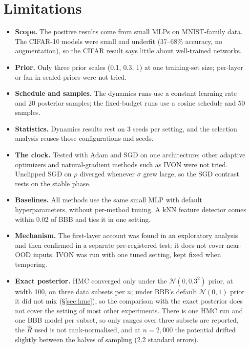 \documentclass[11pt]{article}
\begin{document}
\section{Limitations}
\begin{itemize}
\item \textbf{Scope.} The positive results come from small MLPs on
MNIST-family data. The CIFAR-10 models were small and underfit (37--68\%
accuracy, no augmentation), so the CIFAR result says little about well-trained
networks.
\item \textbf{Prior.} Only three prior scales (0.1, 0.3, 1) at one
training-set size; per-layer or fan-in-scaled priors were not tried.
\item \textbf{Schedule and samples.} The dynamics runs use a constant learning
rate and 20 posterior samples; the fixed-budget runs use a cosine schedule and
50 samples.
\item \textbf{Statistics.} Dynamics results rest on 3 seeds per setting, and the
selection analysis reuses those configurations and seeds.
\item \textbf{The clock.} Tested with Adam and SGD on one architecture; other
adaptive optimizers and natural-gradient methods such as IVON
\citep{shen2024variational} were not tried. Unclipped SGD on $\rho$ diverged
whenever $\sigma$ grew large, so the SGD contrast rests on the stable phase.
\item \textbf{Baselines.} All methods use the same small MLP with default
hyperparameters, without per-method tuning. A kNN feature detector comes within
0.02 of BBB and ties it in one setting.
\item \textbf{Mechanism.} The first-layer account was found in an
exploratory analysis and then confirmed in a separate pre-registered test; it
does not cover near-OOD inputs. IVON was run with one tuned setting, kept
fixed when tempering.
\item \textbf{Exact posterior.} HMC converged only under the $\mathcal N(0,0.3^2)$
prior, at width 100, on three data subsets per $n$; under BBB's default
$\mathcal N(0,1)$ prior it did not mix (\S\ref{sec:hmc}), so the comparison with
the exact posterior does not cover the setting of most other experiments.
There is one HMC run and one BBB model per subset, so only ranges over
three subsets are reported, the $\hat R$ used is not rank-normalised, and at $n=2{,}000$ the
potential drifted slightly between the halves of sampling (2.2 standard
errors).
\end{itemize}
\end{document}
